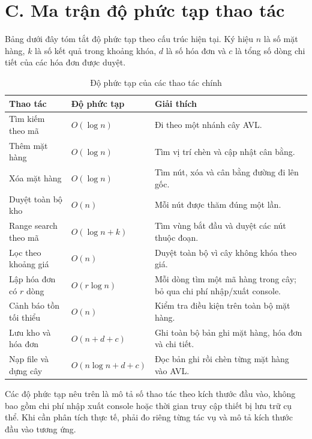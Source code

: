 \section*{C. Ma trận độ phức tạp thao tác}
Bảng dưới đây tóm tắt độ phức tạp theo cấu trúc hiện tại. Ký hiệu $n$ là số mặt hàng, $k$ là số kết quả trong khoảng khóa, $d$ là số hóa đơn và $c$ là tổng số dòng chi tiết của các hóa đơn được duyệt.
\begin{table}[H]
\centering
\caption{Độ phức tạp của các thao tác chính}
\small
\begin{tabular}{@{}p{4.2cm}p{2.1cm}p{6.5cm}@{}}
\toprule
\textbf{Thao tác} & \textbf{Độ phức tạp} & \textbf{Giải thích} \\
\midrule
Tìm kiếm theo mã & $O(\log n)$ & Đi theo một nhánh cây AVL. \\
Thêm mặt hàng & $O(\log n)$ & Tìm vị trí chèn và cập nhật cân bằng. \\
Xóa mặt hàng & $O(\log n)$ & Tìm nút, xóa và cân bằng đường đi lên gốc. \\
Duyệt toàn bộ kho & $O(n)$ & Mỗi nút được thăm đúng một lần. \\
Range search theo mã & $O(\log n+k)$ & Tìm vùng bắt đầu và duyệt các nút thuộc đoạn. \\
Lọc theo khoảng giá & $O(n)$ & Duyệt toàn bộ vì cây không khóa theo giá. \\
Lập hóa đơn có $r$ dòng & $O(r\log n)$ & Mỗi dòng tìm một mã hàng trong cây; bỏ qua chi phí nhập/xuất console. \\
Cảnh báo tồn tối thiểu & $O(n)$ & Kiểm tra điều kiện trên toàn bộ mặt hàng. \\
Lưu kho và hóa đơn & $O(n+d+c)$ & Ghi toàn bộ bản ghi mặt hàng, hóa đơn và chi tiết. \\
Nạp file và dựng cây & $O(n\log n+d+c)$ & Đọc bản ghi rồi chèn từng mặt hàng vào AVL. \\
\bottomrule
\end{tabular}
\end{table}

Các độ phức tạp nêu trên là mô tả số thao tác theo kích thước đầu vào, không bao gồm chi phí nhập xuất console hoặc thời gian truy cập thiết bị lưu trữ cụ thể. Khi cần phân tích thực tế, phải đo riêng từng tác vụ và mô tả kích thước đầu vào tương ứng.

